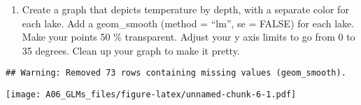 \documentclass[]{article}
\newenvironment{Shaded}{\begin{snugshade}}{\end{snugshade}}
\newcommand{\KeywordTok}[1]{\textcolor[rgb]{0.13,0.29,0.53}{\textbf{#1}}}
\newcommand{\DataTypeTok}[1]{\textcolor[rgb]{0.13,0.29,0.53}{#1}}
\newcommand{\DecValTok}[1]{\textcolor[rgb]{0.00,0.00,0.81}{#1}}
\newcommand{\FloatTok}[1]{\textcolor[rgb]{0.00,0.00,0.81}{#1}}
\newcommand{\StringTok}[1]{\textcolor[rgb]{0.31,0.60,0.02}{#1}}
\newcommand{\CommentTok}[1]{\textcolor[rgb]{0.56,0.35,0.01}{\textit{#1}}}
\newcommand{\OtherTok}[1]{\textcolor[rgb]{0.56,0.35,0.01}{#1}}
\newcommand{\OperatorTok}[1]{\textcolor[rgb]{0.81,0.36,0.00}{\textbf{#1}}}
\newcommand{\NormalTok}[1]{#1}
\providecommand{\tightlist}{%
  \setlength{\itemsep}{0pt}\setlength{\parskip}{0pt}}
\begin{document}
\begin{enumerate}
\def\labelenumi{\arabic{enumi}.}
\setcounter{enumi}{15}
\tightlist
\item
  Create a graph that depicts temperature by depth, with a separate
  color for each lake. Add a geom\_smooth (method = ``lm'', se = FALSE)
  for each lake. Make your points 50 \% transparent. Adjust your y axis
  limits to go from 0 to 35 degrees. Clean up your graph to make it
  pretty.
\end{enumerate}

\begin{Shaded}
\end{Shaded}

\begin{verbatim}
## Warning: Removed 73 rows containing missing values (geom_smooth).
\end{verbatim}

\texttt{[image: A06\_GLMs\_files/figure-latex/unnamed-chunk-6-1.pdf]}
\end{document}
